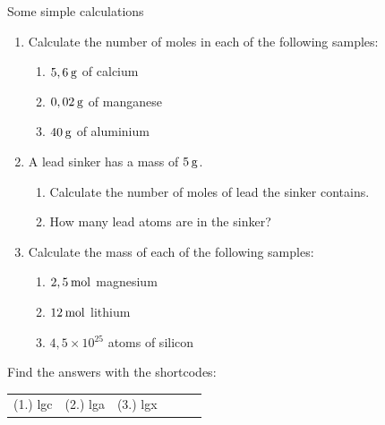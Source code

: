     \noindent
\label{m38717*secfhsst!!!underscore!!!id539}
            \begin{exercises} {Some simple calculations}
            \nopagebreak
      \label{m38717*id278090}\begin{enumerate}[noitemsep, label=\textbf{\arabic*}. ] 
            \label{m38717*uid24}\item Calculate the number of moles in each of the following samples:
\label{m38717*id278106}\begin{enumerate}[noitemsep, label=\textbf{\alph*}. ] 
            \label{m38717*uid25}\item $5,6\phantom{\rule{2pt}{0ex}}\mathrm{g}$ of calcium
\label{m38717*uid26}\item $0,02\phantom{\rule{2pt}{0ex}}\mathrm{g}$ of manganese
\label{m38717*uid27}\item $40\phantom{\rule{2pt}{0ex}}\mathrm{g}$ of aluminium
\end{enumerate}
                \label{m38717*uid28}\item A lead sinker has a mass of $5\phantom{\rule{2pt}{0ex}}\mathrm{g}$.
\label{m38717*id278159}\begin{enumerate}[noitemsep, label=\textbf{\alph*}. ] 
            \label{m38717*uid29}\item Calculate the number of moles of lead the sinker contains.
\label{m38717*uid30}\item How many lead atoms are in the sinker?
\end{enumerate}
                \label{m38717*uid31}\item Calculate the mass of each of the following samples:
\label{m38717*id278201}\begin{enumerate}[noitemsep, label=\textbf{\alph*}. ] 
            \label{m38717*uid32}\item $2,5\phantom{\rule{2pt}{0ex}}\mathrm{mol}$ magnesium
\label{m38717*uid33}\item $12\phantom{\rule{2pt}{0ex}}\mathrm{mol}$ lithium
\label{m38717*uid34}\item $4,5\ensuremath{\times} 10{}^{25}$ atoms of silicon
\end{enumerate}
                \end{enumerate}
    \label{m38717*cid5}
\par {} Find the answers with the shortcodes:
 \par \begin{tabular}[h]{cccccc}
 (1.) lgc  &  (2.) lga  &  (3.) lgx  & \end{tabular}
\end{exercises}

